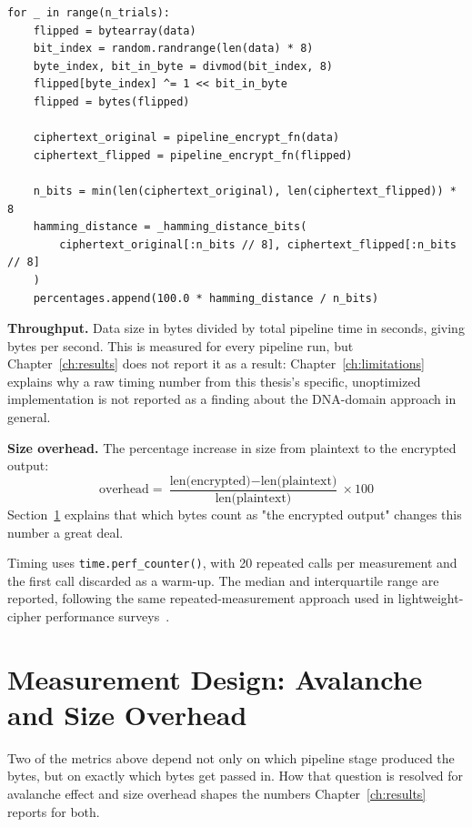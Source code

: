 \documentclass[12pt,a4paper,twoside]{report}
\numberwithin{equation}{chapter}
\begin{document}
\begin{lstlisting}[caption={Avalanche-effect trial loop: one-bit flip,
run both copies through the pipeline, score the Hamming distance
between the outputs (\texttt{src/avalanche.py}).},
label={lst:avalanche-algo}]
for _ in range(n_trials):
    flipped = bytearray(data)
    bit_index = random.randrange(len(data) * 8)
    byte_index, bit_in_byte = divmod(bit_index, 8)
    flipped[byte_index] ^= 1 << bit_in_byte
    flipped = bytes(flipped)

    ciphertext_original = pipeline_encrypt_fn(data)
    ciphertext_flipped = pipeline_encrypt_fn(flipped)

    n_bits = min(len(ciphertext_original), len(ciphertext_flipped)) * 8
    hamming_distance = _hamming_distance_bits(
        ciphertext_original[:n_bits // 8], ciphertext_flipped[:n_bits // 8]
    )
    percentages.append(100.0 * hamming_distance / n_bits)
\end{lstlisting}

\textbf{Throughput.} Data size in bytes divided by total pipeline time
in seconds, giving bytes per second. This is measured for every pipeline
run, but Chapter~\ref{ch:results} does not report it as a result:
Chapter~\ref{ch:limitations} explains why a raw timing number from this
thesis's specific, unoptimized implementation is not reported as a
finding about the DNA-domain approach in general.

\textbf{Size overhead.} The percentage increase in size from plaintext
to the encrypted output:
\begin{equation}
\text{overhead} = \frac{\text{len(encrypted)} - \text{len(plaintext)}}{\text{len(plaintext)}} \times 100
\label{eq:overhead}
\end{equation}
Section~\ref{sec:measurement-design} explains that which bytes count as "the
encrypted output" changes this number a great deal.

Timing uses \texttt{time.perf\_counter()}, with 20 repeated calls per
measurement and the first call discarded as a warm-up. The median and
interquartile range are reported, following the same repeated-measurement
approach used in lightweight-cipher performance surveys~\cite{ascon-survey}.

\section{Measurement Design: Avalanche and Size Overhead}
\label{sec:measurement-design}
Two of the metrics above depend not only on which pipeline stage
produced the bytes, but on exactly which bytes get passed in. How that
question is resolved for avalanche effect and size overhead shapes the
numbers Chapter~\ref{ch:results} reports for both.
\end{document}
